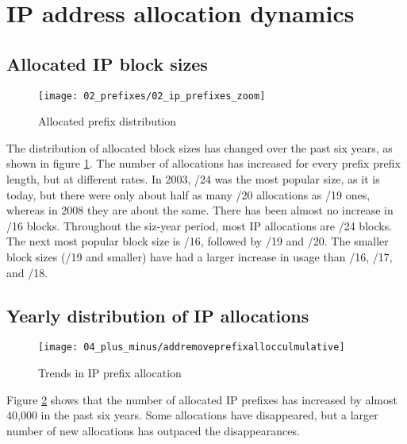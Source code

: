 \section{IP address allocation dynamics}
\label{sec:allocations}



\subsection{Allocated IP block sizes}
\begin{figure}[htbp]
 	\centering
 		\texttt{[image: 02\_prefixes/02\_ip\_prefixes\_zoom]}
	\caption{Allocated prefix distribution}
 	\label{fig:IP allocations}
\end{figure}
The distribution of allocated block sizes has changed over the past six years, as shown in figure \ref{fig:IP allocations}. The number of allocations has increased for every prefix prefix length, but at different rates. In 2003, /24 was the most popular size, as it is today, but there were only about half as many /20 allocations as /19 ones, whereas in 2008 they are about the same. There has been almost no increase in /16 blocks. Throughout the siz-year period, most IP allocations are /24 blocks. The next most popular block size is /16, followed by /19 and /20. The smaller block sizes (/19 and smaller) have had a larger increase in usage than /16, /17, and /18.
\subsection{Yearly distribution of IP allocations}
\begin{figure}[htbp]
 	\centering
 		\texttt{[image: 04\_plus\_minus/addremoveprefixallocculmulative]}
	\caption{Trends in IP prefix allocation}
 	\label{fig:IP allocations new and gone}
\end{figure}
Figure \ref{fig:IP allocations new and gone} shows that the number of allocated IP prefixes has increased by almost 40,000 in the past six years. Some allocations have disappeared, but a larger number of new allocations has outpaced the disappearances.

